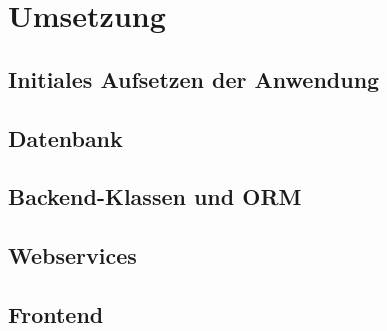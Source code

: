 \section{Umsetzung}
\subsection{Initiales Aufsetzen der Anwendung}
\subsection{Datenbank}
\subsection{Backend-Klassen und ORM}
\subsection{Webservices}
\subsection{Frontend}